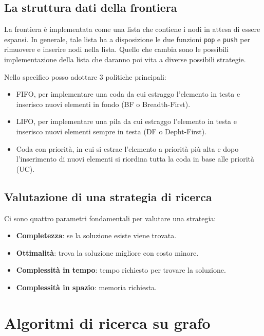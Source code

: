 \subsection{La struttura dati della frontiera}
La frontiera \`e implementata come una lista che contiene i nodi in attesa di essere espansi.
In generale, tale lista ha a disposizione le due funzioni \verb|pop| e \verb|push| per rimuovere
e inserire nodi nella lista. Quello che cambia sono le possibili implementazione della lista
che daranno poi vita a diverse possibili strategie.

Nello specifico posso adottare 3 politiche principali:
\begin{itemize}
	\item FIFO, per implementare una coda da cui estraggo l'elemento in testa e inserisco
	      nuovi elementi in fondo (BF o Breadth-First).
	\item LIFO, per implementare una pila da cui estraggo l'elemento in testa e inserisco nuovi
	      elementi sempre in testa (DF o Depht-First).
	\item Coda con priorit\`a, in cui si estrae l'elemento a priorit\`a pi\`u alta e dopo
	      l'inserimento di nuovi elementi si riordina tutta la coda in base alle priorit\`a
	      (UC).
\end{itemize}

\subsection{Valutazione di una strategia di ricerca}
Ci sono quattro parametri fondamentali per valutare una strategia:
\begin{itemize}
	\item \textbf{Completezza}: se la soluzione esiste viene trovata.
	\item \textbf{Ottimalit\`a}: trova la soluzione migliore con costo minore.
	\item \textbf{Complessit\`a in tempo}: tempo richiesto per trovare la soluzione.
	\item \textbf{Complessit\`a in spazio}: memoria richiesta.
\end{itemize}

\section{Algoritmi di ricerca su grafo}
